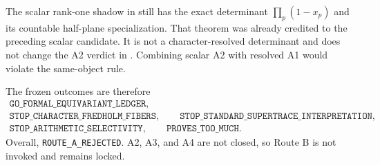 The scalar rank-one shadow in  still has the exact
determinant $\prod_p(1-x_p)$ and its countable half-plane specialization.
That theorem was already credited to the preceding scalar candidate.  It is
not a character-resolved determinant and does not change the A2 verdict in
.  Combining scalar A2 with resolved A1 would violate the
same-object rule.

The frozen outcomes are therefore
\[
\begin{gathered}
 \texttt{GO\_FORMAL\_EQUIVARIANT\_LEDGER},\\
 \texttt{STOP\_CHARACTER\_FREDHOLM\_FIBERS},\qquad
 \texttt{STOP\_STANDARD\_SUPERTRACE\_INTERPRETATION},\\
 \texttt{STOP\_ARITHMETIC\_SELECTIVITY},\qquad
 \texttt{PROVES\_TOO\_MUCH}.
\end{gathered}
\tag{8.3}
\]
Overall, \texttt{ROUTE\_A\_REJECTED}.  A2, A3, and A4 are not closed, so
Route B is not invoked and remains locked.
